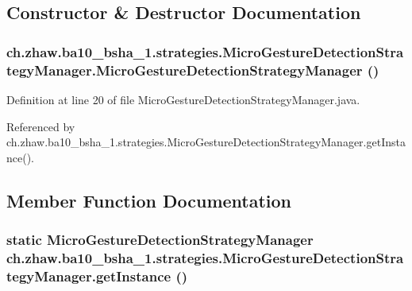\subsection{Constructor \& Destructor Documentation}
\hypertarget{classch_1_1zhaw_1_1ba10__bsha__1_1_1strategies_1_1MicroGestureDetectionStrategyManager_a9a48672953f53963978788452f6cc59b}{
\subsubsection[{MicroGestureDetectionStrategyManager}]{\setlength{\rightskip}{0pt plus 5cm}ch.zhaw.ba10\_\-bsha\_\-1.strategies.MicroGestureDetectionStrategyManager.MicroGestureDetectionStrategyManager ()}}
\label{classch_1_1zhaw_1_1ba10__bsha__1_1_1strategies_1_1MicroGestureDetectionStrategyManager_a9a48672953f53963978788452f6cc59b}


Definition at line 20 of file MicroGestureDetectionStrategyManager.java.

Referenced by ch.zhaw.ba10\_\-bsha\_\-1.strategies.MicroGestureDetectionStrategyManager.getInstance().

\subsection{Member Function Documentation}
\hypertarget{classch_1_1zhaw_1_1ba10__bsha__1_1_1strategies_1_1MicroGestureDetectionStrategyManager_addeac950c5b59e0e2e6079b4339e890e}{
\subsubsection[{getInstance}]{\setlength{\rightskip}{0pt plus 5cm}static {\bf MicroGestureDetectionStrategyManager} ch.zhaw.ba10\_\-bsha\_\-1.strategies.MicroGestureDetectionStrategyManager.getInstance ()}}
\label{classch_1_1zhaw_1_1ba10__bsha__1_1_1strategies_1_1MicroGestureDetectionStrategyManager_addeac950c5b59e0e2e6079b4339e890e}


